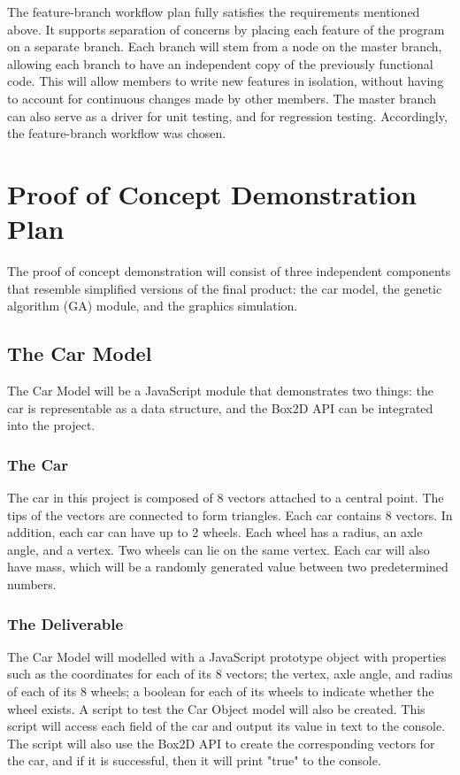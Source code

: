 \documentclass{article}
\begin{document}
The feature-branch workflow plan fully satisfies the requirements mentioned 
above. It supports separation of concerns by placing each feature of the program 
on a separate branch. Each branch will stem from a node on the master branch, 
allowing each branch to have an independent copy of the previously functional 
code. This will allow members to write new features in isolation, without having 
to account for continuous changes made by other members. The master branch can 
also serve as a driver for unit testing, and for regression testing. 
Accordingly, the feature-branch workflow was chosen.

\section{Proof of Concept Demonstration Plan}
The proof of concept demonstration will consist of three independent components 
that resemble simplified versions of the final product: the car model, the 
genetic algorithm (GA) module, and the graphics simulation. 

\subsection{The Car Model}
The Car Model will be a JavaScript module that demonstrates two things: the car 
is representable as a data structure, and the Box2D API can be integrated into 
the project. 

\subsubsection{The Car}
The car in this project is composed of 8 vectors attached to a central point. 
The 
tips of the vectors are connected to form triangles. Each car contains 8 
vectors. In addition, each car can have up to \textcolor{RoyalPurple}{2} wheels. Each wheel has a radius, 
an axle angle, and a vertex. Two wheels can lie on the same vertex. Each car 
will also have mass, which will be a randomly generated value between two 
predetermined numbers.

\subsubsection{The Deliverable}
The Car Model will modelled with a \textcolor{RoyalPurple}{JavaScript prototype object} with properties such as the coordinates for each of its 8 vectors; 
the vertex, axle angle, and radius of each of its 8 wheels; a boolean for each 
of its wheels to indicate whether the wheel exists. A script to test the \textcolor{RoyalPurple}{Car Object}
model will also be created. This script will access each field of the car and 
output its value in text to the console. The script will also use the Box2D API 
to create the corresponding vectors for the car, and if it is successful, then 
it will print "true" to the console.
\end{document}
